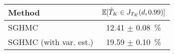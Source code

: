 \begin{tabular}{lc}
\toprule
                Method & $\operatorname{\mathbb{E}}[\hat{T}_K \in J_{T_K}(d, {0.99})]$ \\
\midrule
                 SGHMC &                    12.41 $\pm$ 0.08~\% \\
SGHMC (with var. est.) &                    19.59 $\pm$ 0.10~\% \\
\bottomrule
\end{tabular}

